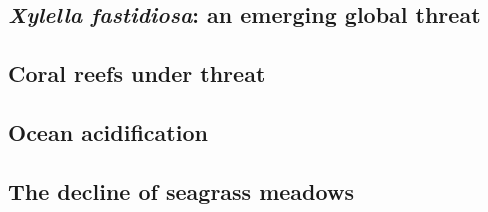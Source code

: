 \subsection{\label{sec:Xylella fastidiosa: an emerging global
    threat}\textit{Xylella
    fastidiosa}: an emerging global threat}

\subsection{\label{sec:Coral reefs under threat} Coral reefs under threat}

\subsection{\label{sec:Ocean acidification} Ocean acidification}

\subsection{\label{sec:The decline of seagrass meadows} The decline of seagrass
  meadows}







